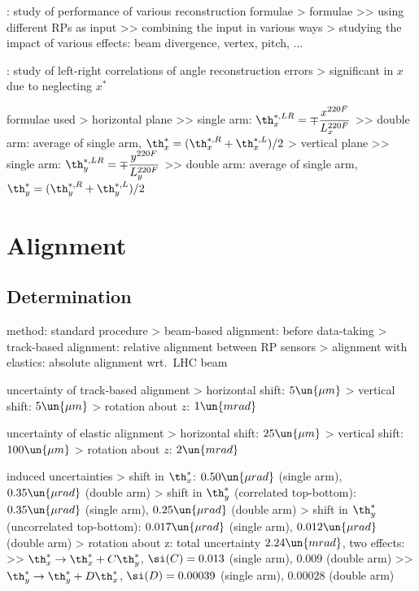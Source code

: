 \>  : study of performance of various reconstruction formulae
\>> formulae
\>>> using different RPs as input
\>>> combining the input in various ways
\>> studying the impact of various effects: beam divergence, vertex, pitch, ...

\>  : study of left-right correlations of angle reconstruction errors
\>> significant in $x$ due to neglecting $x^*$

\> formulae used
\>> horizontal plane
\>>> single arm: $\displaystyle \th_x^{*,LR} = \mp {x^{220F}\over L_x^{220F}}$
\>>> double arm: average of single arm, $\th_x^* = (\th_x^{*,R} + \th_x^{*,L}) / 2$
\>> vertical plane
\>>> single arm: $\displaystyle \th_y^{*,LR} = \mp {y^{220F}\over L_y^{220F}}$
\>>> double arm: average of single arm, $\th_y^* = (\th_y^{*,R} + \th_y^{*,L}) / 2$


\section[alignment]{Alignment}

\subsection[alignment-det]{Determination}

\> method: standard procedure
\>> beam-based alignment: before data-taking
\>> track-based alignment: relative alignment between RP sensors
\>> alignment with elastics: absolute alignment wrt.~LHC beam

\> uncertainty of track-based alignment
\>> horizontal shift: $5\un{\mu m}$
\>> vertical shift: $5\un{\mu m}$
\>> rotation about $z$: $1\un{mrad}$

\> uncertainty of elastic alignment
\>> horizontal shift: $25\un{\mu m}$
\>> vertical shift: $100\un{\mu m}$
\>> rotation about $z$: $2\un{mrad}$

\> induced uncertainties
\>> shift in $\th_x^*$: $0.50\un{\mu rad}$ (single arm), $0.35\un{\mu rad}$ (double arm)
\>> shift in $\th_y^*$ (correlated top-bottom): $0.35\un{\mu rad}$ (single arm), $0.25\un{\mu rad}$ (double arm)
\>> shift in $\th_y^*$ (uncorrelated top-bottom): $0.017\un{\mu rad}$ (single arm), $0.012\un{\mu rad}$ (double arm)
\>> rotation about z: total uncertainty $2.24\un{mrad}$, two effects:
\>>> $\th_x^* \rightarrow \th_x^* + C \th_y^*$, $\si(C) = 0.013$ (single arm), $0.009$ (double arm)
\>>> $\th_y^* \rightarrow \th_y^* + D \th_x^*$, $\si(D) = 0.00039$ (single arm), $0.00028$ (double arm)

